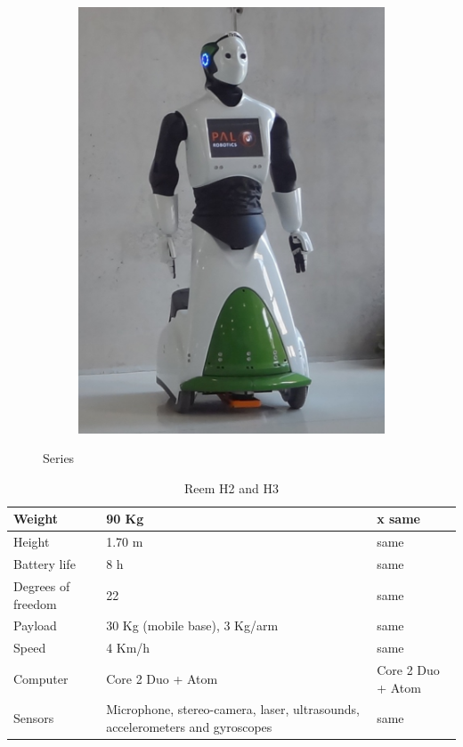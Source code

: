 \begin{figure}
\begin{subfigure}[b]{0.4\linewidth}
           \includegraphics{figures/reemh3}
           \caption{}
           \label{fig:reemh3}
    \end{subfigure}
    \caption{ Series}
    \label{fig:reemseries}
\end{figure}

\begin{table}[ht]
    \centering
    \begin{tabularx}{\linewidth}{| X | X | X |}
    \hline
    Weight & 90 Kg & x same\\ \hline
    Height & 1.70 m & same \\ \hline
    Battery life & 8 h & same \\ \hline
    Degrees of freedom & 22 & same \\ \hline
    Payload & 30 Kg (mobile base), 3 Kg/arm & same\\ \hline
    Speed & 4 Km/h & same\\ \hline
    Computer & Core 2 Duo + Atom & Core 2 Duo + Atom \\ \hline
    Sensors & Microphone, stereo-camera, laser, ultrasounds, accelerometers and gyroscopes & same \\
    \hline
    \end{tabularx}
    \caption{Reem H2 and H3}
    \label{tab:rh2}
\end{table}

